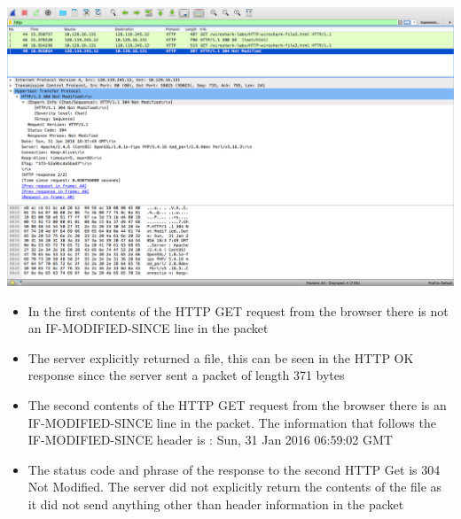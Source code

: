 \documentclass{article}
\begin{document}
\includegraphics[width=\textwidth]{HTTPConditionalNotModified}\\
\begin{itemize}
  \item In the first contents of the HTTP GET request from the browser there is not an IF-MODIFIED-SINCE line in the packet
  \item The server explicitly returned a file, this can be seen in the HTTP OK response since the server sent a packet of length 371 bytes
  \item The second contents of the HTTP GET request from the browser there is an IF-MODIFIED-SINCE line in the packet. The information that follows the IF-MODIFIED-SINCE header is : Sun, 31 Jan 2016 06:59:02 GMT
  \item The status code and phrase of the response to the second HTTP Get is 304 Not Modified. The server did not explicitly return the contents of the file as it did not send anything other than header information in the packet
\end{itemize}
\end{document}
